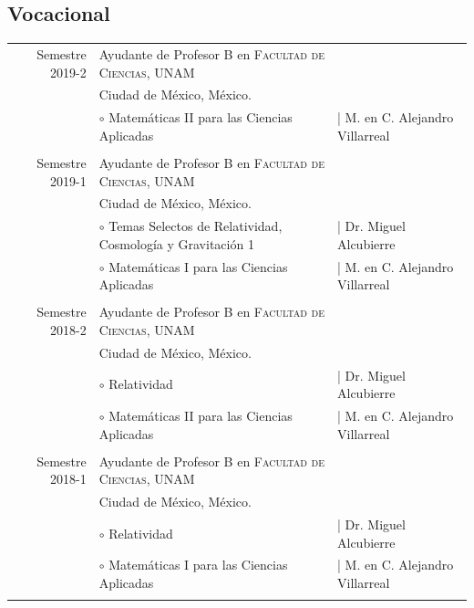 \documentclass[a4paper,10pt]{article} %
\begin{document}
\subsection*{Vocacional}
\begin{tabular}{r|p{7.8cm}p{4cm}}

Semestre 2019-2 & Ayudante de Profesor B en \textsc{Facultad de Ciencias, UNAM} &\\
& \small Ciudad de México, México. & \\
& \footnotesize $\circ$ Matemáticas II para las Ciencias Aplicadas & | {\footnotesize M. en C. Alejandro Villarreal}\\
\multicolumn{3}{c}{} \\


Semestre 2019-1 & Ayudante de Profesor B en \textsc{Facultad de Ciencias, UNAM} &\\
& \small Ciudad de México, México. & \\
& \footnotesize $\circ$ Temas Selectos de Relatividad, Cosmología y Gravitación 1 & | {\footnotesize Dr. Miguel Alcubierre}\\
& \footnotesize $\circ$ Matemáticas I para las Ciencias Aplicadas & | {\footnotesize M. en C. Alejandro Villarreal}\\
\multicolumn{3}{c}{} \\


Semestre 2018-2 & Ayudante de Profesor B en \textsc{Facultad de Ciencias, UNAM} &\\
& \small Ciudad de México, México. & \\
& \footnotesize $\circ$ Relatividad & | {\footnotesize Dr. Miguel Alcubierre}\\
& \footnotesize $\circ$ Matemáticas II para las Ciencias Aplicadas & | {\footnotesize M. en C. Alejandro Villarreal}\\
\multicolumn{3}{c}{} \\


Semestre 2018-1 & Ayudante de Profesor B en \textsc{Facultad de Ciencias, UNAM} &\\
&\small Ciudad de México, México. & \\
& \footnotesize $\circ$ Relatividad & | {\footnotesize Dr. Miguel Alcubierre}\\
& \footnotesize $\circ$ Matemáticas I para las Ciencias Aplicadas & | {\footnotesize M. en C. Alejandro Villarreal}\\
\multicolumn{3}{c}{} \\

\end{tabular}
\end{document}
